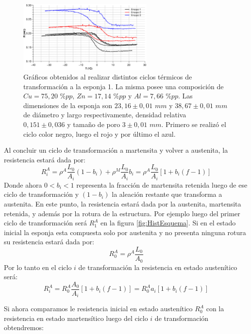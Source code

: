 \documentclass[a4paper,12pt,fleqn,twoside,openany]{book}
\begin{document}
\begin{figure}
 \centering
 \includegraphics[width=0.6\textwidth]{Img/Resultados/Resistencia/RED_resultados.eps}
 \caption{Gráficos obtenidos al realizar distintos ciclos térmicos de transformación a la esponja 1. La misma posee una composición de $Cu=75,20$ $\%pp$, $Zn=17,14$ $\%pp$ y $Al=7,66$ $\%pp$. Las dimensiones de la esponja son $23,16 \pm0,01$ $mm$ y $38,67 \pm0,01$ $mm$ de diámetro y largo respectivamente, densidad relativa $0,151 \pm 0,036$ y tamaño de poro $3 \pm 0,01$ $mm$.
 Primero se realizó el ciclo color negro, luego el rojo y por último el azul.} 
 \label{fig:RED_resultados}
 \end{figure}

 Al concluir un ciclo de transformación a martensita y volver a austenita, la resistencia estará dada por:
\begin{equation}
 R^A _i=\rho^A \frac{L_0}{A_i}(1-b_i) + \rho^M \frac{L_0}{A_i}b_i = \rho^A \frac{L_0}{A_i} [1+ b_i (f-1)]
\end{equation}
Donde ahora $0<b_i <1$ representa la fracción de martensita retenida luego de ese ciclo de transformación y $(1-b_ i)$ la aleación restante que transforma a austenita. En este punto, la resistencia estará dada por la austenita, martensita retenida, y además por la rotura de la estructura. Por ejemplo luego del primer ciclo de transformación será $R^A _{1}$ en la figura \ref{fig:HistEsquema}. 
Si en el estado inicial la esponja esta compuesta solo por austenita y no presenta ninguna rotura su resistencia estará dada por:
\begin{equation}
 R^A _0 = \rho^A \frac{L_0}{A_0}
\end{equation}
Por lo tanto en el ciclo $i$ de transformación la resistencia en estado austenítico será:
\begin{equation}
 R^A _i = R^A _0 \frac{A_0}{A_i} [1+b_i (f-1)]=R^A _0 a_i [1+b_i (f-1)] \label{austenita}
\end{equation}

Si ahora comparamos le resistencia inicial en estado austenítico $R^A _0$ con la resistencia en estado martensítico luego del ciclo $i$ de transformación obtendremos:
\end{document}
